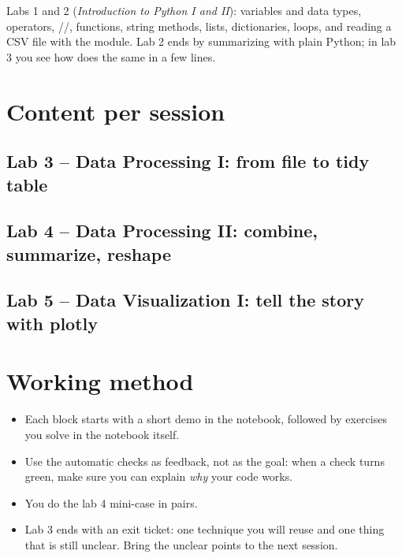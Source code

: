 \documentclass[11pt,a4paper]{article}
\begin{document}
Labs 1 and 2 (\emph{Introduction to Python I and II}): variables and data
types, operators, //, functions, string
methods, lists, dictionaries, loops, and reading a CSV file with the
 module. Lab 2 ends by summarizing  with
plain Python; in lab 3 you see how  does the same in a few
lines.





\section{Content per session}

\subsection{Lab 3 -- Data Processing I: from file to tidy table}


\subsection{Lab 4 -- Data Processing II: combine, summarize, reshape}


\subsection{Lab 5 -- Data Visualization I: tell the story with plotly}


\section{Working method}

\begin{itemize}
  \item Each block starts with a short demo in the notebook, followed by
        exercises you solve in the notebook itself.
  \item Use the automatic checks as feedback, not as the goal: when a
        check turns green, make sure you can explain \emph{why} your code
        works.
  \item You do the lab 4 mini-case in pairs.
  \item Lab 3 ends with an exit ticket: one technique you will reuse and
        one thing that is still unclear. Bring the unclear points to the
        next session.
\end{itemize}
\end{document}
